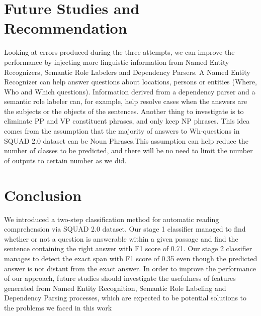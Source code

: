 \section{Future Studies and Recommendation}
Looking at errors produced during the three attempts, we can improve the performance by injecting more linguistic information from Named Entity Recognizers, Semantic Role Labelers and Dependency Parsers. A Named Entity Recognizer can help answer questions about locations, persons or entities (Where, Who and Which questions). Information derived from a dependency parser and a semantic role labeler can, for example, help resolve cases when the answers are the subjects or the objects of the sentences. Another thing to investigate is to eliminate PP and VP constituent phrases, and only keep NP phrases. This idea comes from the assumption that the majority of answers to Wh-questions in SQUAD 2.0 dataset can be Noun Phrases.This assumption can help reduce the number of classes to be predicted, and there will be no need to limit the number of outputs to certain number as we did.

\section{Conclusion}
We introduced a two-step classification method for automatic reading comprehension via SQUAD 2.0 dataset. Our stage 1 classifier managed to find whether or not a question is answerable within a given passage and find the sentence containing the right answer with F1 score of 0.71. Our stage 2 classifier manages to detect the exact span with F1 score of 0.35 even though the predicted answer is not distant from the exact answer. In order to improve the performance of our approach, future studies should investigate the usefulness of features generated from Named Entity Recognition, Semantic Role Labeling and Dependency Parsing processes, which are expected to be potential solutions to the problems we faced in this work

